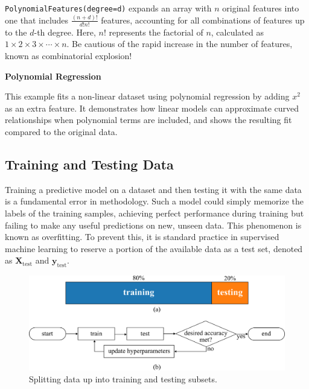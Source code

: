 \documentclass[12pt,letter]{article}
\begin{document}
\begin{mdframed}[middlelinewidth=0.5mm]
\begin{center}
\end{center}
\texttt{PolynomialFeatures(degree=d)} expands an array with $n$ original features into one that includes $\frac{(n+d)!}{d!n!}$ features, accounting for all combinations of features up to the $d$-th degree. Here, $n!$ represents the factorial of $n$, calculated as $1 \times 2 \times 3 \times \cdots \times n$. Be cautious of the rapid increase in the number of features, known as combinatorial explosion!
\end{mdframed}

\begin{example}
\textbf{Polynomial Regression}

\noindent This example fits a non-linear dataset using polynomial regression by adding $x^2$ as an extra feature. It demonstrates how linear models can approximate curved relationships when polynomial terms are included, and shows the resulting fit compared to the original data.
\end{example}



\subsection{Training and Testing Data}

Training a predictive model on a dataset and then testing it with the same data is a fundamental error in methodology. Such a model could simply memorize the labels of the training samples, achieving perfect performance during training but failing to make any useful predictions on new, unseen data. This phenomenon is known as overfitting. To prevent this, it is standard practice in supervised machine learning to reserve a portion of the available data as a test set, denoted as $\textbf{X}_\text{test}$ and $\textbf{y}_\text{test}$.

		\begin{figure}[H]
			\centering
			\includegraphics[]{../figures/training_test_datasets}
			\caption{Splitting data up into training and testing subsets.}
			\label{fig:training_test_datasets}
		\end{figure}
\end{document}
